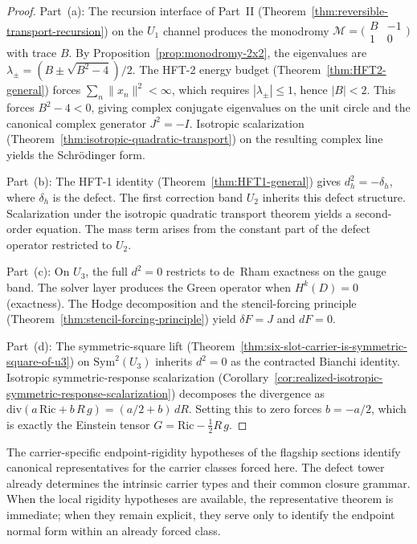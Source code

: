 \begin{proof}
Part~(a): The recursion interface of Part~II
(Theorem~\ref{thm:reversible-transport-recursion}) on the $U_1$ channel
produces the monodromy $\mathcal M = \bigl(\begin{smallmatrix} B & -1 \\ 1 &
0 \end{smallmatrix}\bigr)$ with trace $B$. By Proposition~\ref{prop:monodromy-2x2},
the eigenvalues are $\lambda_\pm = (B \pm \sqrt{B^2 - 4})/2$. The HFT-2
energy budget (Theorem~\ref{thm:HFT2-general}) forces
$\sum_n \|x_n\|^2 < \infty$, which requires $|\lambda_\pm| \le 1$, hence
$|B| < 2$. This forces $B^2 - 4 < 0$, giving complex conjugate eigenvalues
on the unit circle and the canonical complex generator $J^2 = -I$. Isotropic
scalarization (Theorem~\ref{thm:isotropic-quadratic-transport}) on the
resulting complex line yields the Schr\"odinger form.

Part~(b): The HFT-1 identity (Theorem~\ref{thm:HFT1-general}) gives
$d_h^2 = -\delta_h$, where $\delta_h$ is the defect. The first correction
band $U_2$ inherits this defect structure. Scalarization under the isotropic
quadratic transport theorem yields a second-order equation. The mass term
arises from the constant part of the defect operator restricted to $U_2$.

Part~(c): On $U_3$, the full $d^2 = 0$ restricts to de~Rham exactness on
the gauge band. The solver layer produces the Green operator when
$H^k(D) = 0$ (exactness). The Hodge decomposition and the stencil-forcing
principle (Theorem~\ref{thm:stencil-forcing-principle}) yield $\delta F = J$
and $dF = 0$.

Part~(d): The symmetric-square lift
(Theorem~\ref{thm:six-slot-carrier-is-symmetric-square-of-u3}) on
$\mathrm{Sym}^2(U_3)$ inherits $d^2 = 0$ as the contracted Bianchi
identity. Isotropic symmetric-response scalarization
(Corollary~\ref{cor:realized-isotropic-symmetric-response-scalarization})
decomposes the divergence as
$\mathrm{div}(a\,\mathrm{Ric} + b\,R\,g) = (a/2 + b)\,dR$. Setting
this to zero forces $b = -a/2$, which is exactly the Einstein tensor
$G = \mathrm{Ric} - \frac{1}{2}R\,g$.
\end{proof}

\begin{remark}
\label{rem:endpoint-rigidity-packages-as-consequences}
The carrier-specific endpoint-rigidity hypotheses of the flagship sections
identify canonical representatives for the carrier classes forced here. The
defect tower already determines the intrinsic carrier types and their common
closure grammar. When the local rigidity hypotheses are available, the
representative theorem is immediate; when they remain explicit, they serve
only to identify the endpoint normal form within an already forced class.
\end{remark}


